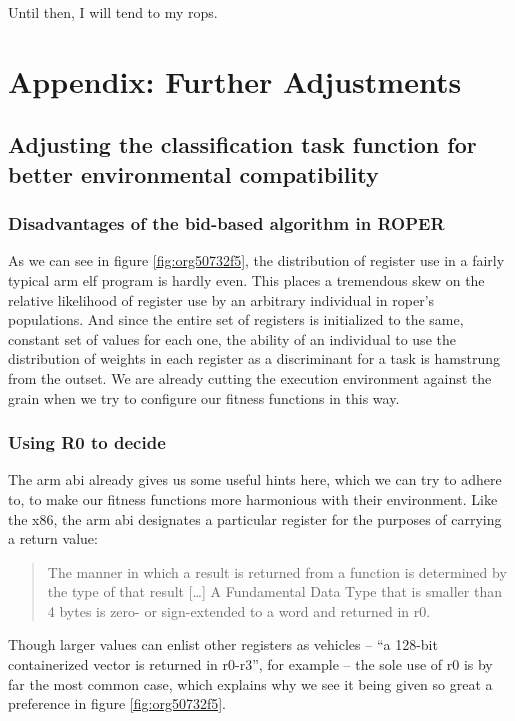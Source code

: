 \documentclass[12pt,glossary]{dalthesis}
\begin{document}
Until then, I will tend to my \glspl{rop}.





\appendix
\chapter{Appendix: Further Adjustments}
\label{sec:org8e73fb5}
\section{Adjusting the classification task function for better environmental compatibility}
\label{sec:org1594770}
\subsection{Disadvantages of the bid-based algorithm in ROPER}
\label{sec:orgd8902ba}
As we can see in figure \ref{fig:org50732f5}, the distribution of register use
in a fairly typical \gls{arm} \gls{elf} program is hardly even. This places a tremendous skew
on the relative likelihood of register use by an arbitrary individual in \gls{roper}'s
populations. And since the entire set of registers is initialized to the same, constant
set of values for each one, the ability of an individual to use the distribution of weights
in each register as a discriminant for a task is hamstrung from the outset. We are already
cutting the execution environment against the grain when we try to configure our
fitness functions in this way.
\subsection{Using R0 to decide}
\label{sec:orgd936141}
The \gls{arm} \gls{abi} \cite{arm_abi} already gives us some useful hints here, which we can try to adhere to, to
make our fitness functions more harmonious with their environment. Like the \gls{x86}, the \gls{arm}
\gls{abi} designates a particular register for the purposes of carrying a return value:
\begin{quote}
The manner in which a result is returned from a function is determined by the type of that
result [\ldots{}] A Fundamental Data Type that is smaller than 4 bytes is zero- or sign-extended
to a word and returned in r0.
\end{quote}
Though larger values can enlist other registers as vehicles -- ``a 128-bit containerized vector
is returned in r0-r3'', for example -- the sole use of r0 is by far the most common case, which
explains why we see it being given so great a preference in figure \ref{fig:org50732f5}. 
\end{document}
